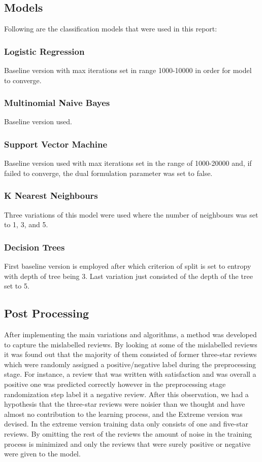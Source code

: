 \documentclass[conference , 11pt]{IEEEtran}
\begin{document}
\subsection{Models}
Following are the classification models that were used in this report:
\subsubsection{Logistic Regression}
Baseline version with max iterations set in range 1000-10000 in order for model to converge.
\subsubsection{Multinomial Naive Bayes}
Baseline version used.
\subsubsection{Support Vector Machine}
Baseline version used with max iterations set in the range of 1000-20000 and, if failed to converge, the dual formulation parameter was set to false.
\subsubsection{K Nearest Neighbours}
Three variations of this model were used where the number of neighbours was set to 1, 3, and 5.
\subsubsection{Decision Trees}
First baseline version is employed after which criterion of split is set to entropy with depth of tree being 3. Last variation just consisted of the depth of the tree set to 5. 


\subsection{Post Processing}

After implementing the main variations and algorithms, a method was developed to capture the mislabelled reviews. By looking at some of the mislabelled reviews it was found out that the majority of them consisted of former three-star reviews which were randomly assigned a positive/negative label during the preprocessing stage. For instance, a review that was written with satisfaction and was overall a positive one was predicted correctly however in the preprocessing stage randomization step label it a negative review. After this observation, we had a hypothesis that the three-star reviews were noisier than we thought and have almost no contribution to the learning process, and the Extreme version was devised. In the extreme version training data only consists of one and five-star reviews. By omitting the rest of the reviews the amount of noise in the training process is minimized and only the reviews that were surely positive or negative were given to the model.
\end{document}
